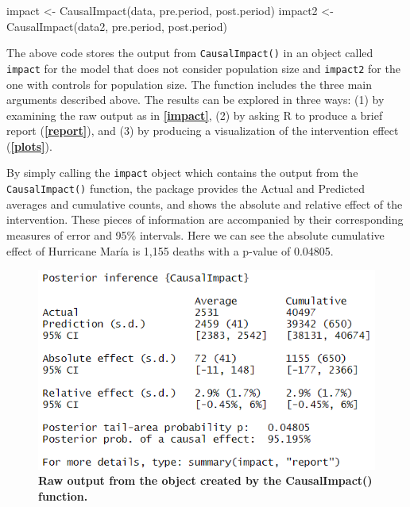 \documentclass[12pt]{article}
\newenvironment{Shaded}{\begin{snugshade}}{\end{snugshade}}
\newcommand{\FunctionTok}[1]{\textcolor[rgb]{0.00,0.00,0.00}{#1}}
\newcommand{\NormalTok}[1]{#1}
\newcommand{\OtherTok}[1]{\textcolor[rgb]{0.56,0.35,0.01}{#1}}
\begin{document}
\begin{Shaded}
\begin{Highlighting}[]
\NormalTok{impact }\OtherTok{\textless{}{-}} \FunctionTok{CausalImpact}\NormalTok{(data, pre.period, post.period)}
\NormalTok{impact2 }\OtherTok{\textless{}{-}} \FunctionTok{CausalImpact}\NormalTok{(data2, pre.period, post.period)}
\end{Highlighting}
\end{Shaded}

The above code stores the output from \texttt{CausalImpact()} in an
object called \texttt{impact} for the model that does not consider
population size and \texttt{impact2} for the one with controls for
population size. The function includes the three main arguments
described above. The results can be explored in three ways: (1) by
examining the raw output as in \textbf{\autoref{impact}}, (2) by asking
R to produce a brief report (\textbf{\autoref{report}}), and (3) by
producing a visualization of the intervention effect
(\textbf{\autoref{plots}}).

By simply calling the \texttt{impact} object which contains the output
from the \texttt{CausalImpact()} function, the package provides the
Actual and Predicted averages and cumulative counts, and shows the
absolute and relative effect of the intervention. These pieces of
information are accompanied by their corresponding measures of error and
95\% intervals. Here we can see the absolute cumulative effect of
Hurricane María is 1,155 deaths with a p-value of 0.04805.

\begin{figure}
\includegraphics[width=1\linewidth]{../MainDocument/Capture} \caption{\textbf{Raw output from the object created by the CausalImpact() function.}\label{impact}}\label{fig:unnamed-chunk-8}
\end{figure}
\end{document}
